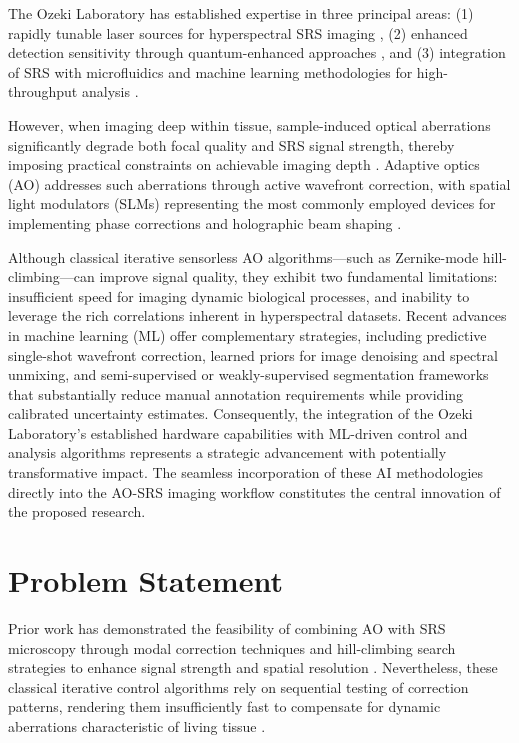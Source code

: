 \documentclass[12pt,a4paper]{article}
\begin{document}
The Ozeki Laboratory has established expertise in three principal areas: (1) rapidly tunable laser sources for hyperspectral SRS imaging \cite{ozeki2019}, (2) enhanced detection sensitivity through quantum-enhanced approaches \cite{ozeki2020b}, and (3) integration of SRS with microfluidics and machine learning methodologies for high-throughput analysis \cite{ozeki2012,ozeki2020a}.

However, when imaging deep within tissue, sample-induced optical aberrations significantly degrade both focal quality and SRS signal strength, thereby imposing practical constraints on achievable imaging depth \cite{ji2020}. Adaptive optics (AO) addresses such aberrations through active wavefront correction, with spatial light modulators (SLMs) representing the most commonly employed devices for implementing phase corrections and holographic beam shaping \cite{papadopoulos2008}.
 
Although classical iterative sensorless AO algorithms—such as Zernike-mode hill-climbing—can improve signal quality, they exhibit two fundamental limitations: insufficient speed for imaging dynamic biological processes, and inability to leverage the rich correlations inherent in hyperspectral datasets. Recent advances in machine learning (ML) offer complementary strategies, including predictive single-shot wavefront correction, learned priors for image denoising and spectral unmixing, and semi-supervised or weakly-supervised segmentation frameworks that substantially reduce manual annotation requirements while providing calibrated uncertainty estimates. Consequently, the integration of the Ozeki Laboratory's established hardware capabilities with ML-driven control and analysis algorithms represents a strategic advancement with potentially transformative impact. The seamless incorporation of these AI methodologies directly into the AO-SRS imaging workflow constitutes the central innovation of the proposed research.

\section{Problem Statement}
Prior work has demonstrated the feasibility of combining AO with SRS microscopy through modal correction techniques and hill-climbing search strategies to enhance signal strength and spatial resolution \cite{wang2024a}. Nevertheless, these classical iterative control algorithms rely on sequential testing of correction patterns, rendering them insufficiently fast to compensate for dynamic aberrations characteristic of living tissue \cite{booth2006,tao2013}.
\end{document}

